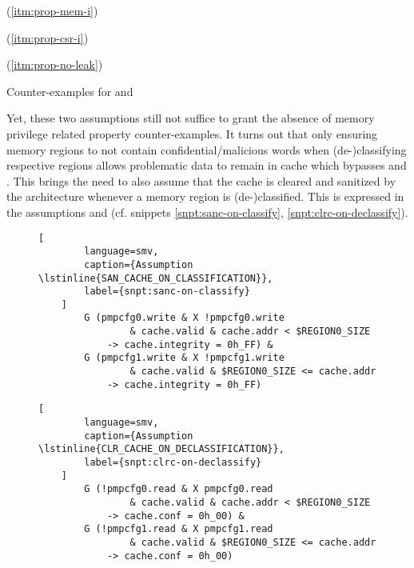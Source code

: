 \begin{table}
    \begin{subtable}{\textwidth}
        \centering
        
        \caption{ (\ref{itm:prop-mem-i})}
        \label{tbl:cex-mem-i-socl}
    \end{subtable}

    \begin{subtable}{\textwidth}
        \centering
        
        \caption{ (\ref{itm:prop-csr-i})}
        \label{tbl:cex-csr-i-socl}
    \end{subtable}

    \begin{subtable}{\textwidth}
        \centering
        
        \caption{ (\ref{itm:prop-no-leak})}
        \label{tbl:cex-no-leak-cod}
    \end{subtable}
    \caption{Counter-examples for  and }
\end{table}

Yet, these two assumptions still not suffice to grant the absence of memory privilege related property counter-examples.
It turns out that only ensuring memory regions to not contain confidential/malicious words when (de-)classifying respective regions allows problematic data to remain in cache which bypasses  and .
This brings the need to also assume that the cache is cleared and sanitized by the architecture whenever a memory region is (de-)classified.
This is expressed in the assumptions  and  (cf. snippets \ref{snpt:sanc-on-classify}, \ref{snpt:clrc-on-declassify}).

\begin{figure}
    \begin{lstlisting}[
        language=smv,
        caption={Assumption \lstinline{SAN_CACHE_ON_CLASSIFICATION}},
        label={snpt:sanc-on-classify}
    ]
        G (pmpcfg0.write & X !pmpcfg0.write
                & cache.valid & cache.addr < $REGION0_SIZE
            -> cache.integrity = 0h_FF) &
        G (pmpcfg1.write & X !pmpcfg1.write
                & cache.valid & $REGION0_SIZE <= cache.addr
            -> cache.integrity = 0h_FF)
    \end{lstlisting}

    \begin{lstlisting}[
        language=smv,
        caption={Assumption \lstinline{CLR_CACHE_ON_DECLASSIFICATION}},
        label={snpt:clrc-on-declassify}
    ]
        G (!pmpcfg0.read & X pmpcfg0.read
                & cache.valid & cache.addr < $REGION0_SIZE
            -> cache.conf = 0h_00) &
        G (!pmpcfg1.read & X pmpcfg1.read
                & cache.valid & $REGION0_SIZE <= cache.addr
            -> cache.conf = 0h_00)
    \end{lstlisting}
\end{figure}


